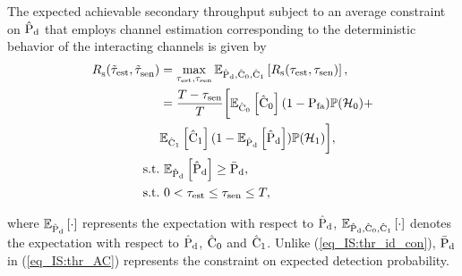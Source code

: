 \begin{theorem} \label{th_IS:th1}
\normalfont
The expected achievable secondary throughput subject to an average constraint on $\epd$ that employs channel estimation corresponding to the deterministic behavior of the interacting channels is given by  
\begin{align}
\trsac(\ttest, \ttsenac) &= \maxi_{\tc{\test}, \tsen} \e{\epd, \ecz, \eco}{\rs(\test, \tsen)}, \nonumber \\ 
\quad &= \frac{T- \tsen}{T} \bigg[ \e{\ecz}{\ecz} (1 - \pfa) \phz + \nonumber \\ \quad & \e{\eco}{\eco} (1 - \e{\epd}{\epd}) \pho  \bigg], \label{eq_IS:thr_AC} \\
\text{s.t.} & \text{ }  \e{\epd}{\epd} \ge \pdd, \label{eq_IS:AC} \\
\tc{\text{s.t.}} & \text{ }  \tc{0 < \test \le \tsen \le T,} \nonumber
\end{align}
\end{theorem} 
where $\e{\epd}{\cdot}$ represents the expectation with respect to $\epd$, $\e{\epd, \ecz, \eco}{\cdot}$ denotes the expectation with respect to $\epd$, $\ecz$ and $\eco$. Unlike (\ref{eq_IS:thr_id_con}), $\pdd$ in (\ref{eq_IS:thr_AC}) represents the constraint on expected detection probability.

\begin{IEEEproof} 
\end{IEEEproof}

